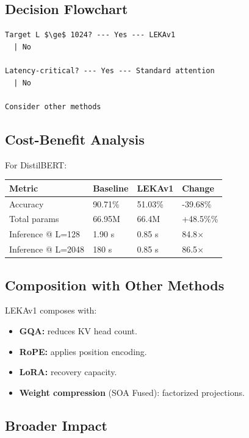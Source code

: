 \subsection{Decision Flowchart}

\begin{lstlisting}
Target L $\ge$ 1024? --- Yes --- LEKAv1
  | No
   
Latency-critical? --- Yes --- Standard attention
  | No
   
Consider other methods
\end{lstlisting}

\subsection{Cost-Benefit Analysis}

For DistilBERT:

\begin{table}[H]
\centering
\small
\begin{tabular}{llll}
\toprule
\textbf{Metric} & \textbf{Baseline} & \textbf{LEKAv1} & \textbf{Change} \\
\midrule
Accuracy & 90.71\% & 51.03\% & -39.68\% \\
Total params & 66.95M & 66.4M & +48.5\%\% \\
Inference @ L=128 & 1.90 s & 0.85 s & 84.8$\times$ \\
Inference @ L=2048 & 180 s & 0.85 s & 86.5$\times$ \\
\bottomrule
\end{tabular}
\end{table}

\subsection{Composition with Other Methods}

LEKAv1 composes with:

\begin{itemize}
\item \textbf{GQA:} reduces KV head count.
\item \textbf{RoPE:} applies position encoding.
\item \textbf{LoRA:} recovery capacity.
\item \textbf{Weight compression} (SOA Fused): factorized projections.

\end{itemize}
\subsection{Broader Impact}

